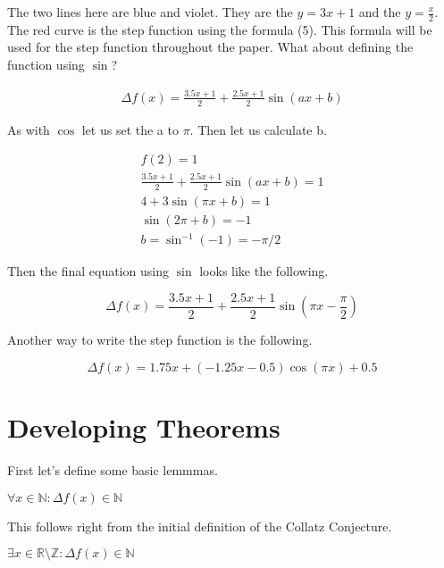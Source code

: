 \documentclass{article}
\begin{document}
\vspace{12pt}

The two lines here are blue and violet. They are the \(y=3x+1\) and the \(y = \frac{x}{2}\).
The red curve is the step function using the formula (5).
This formula will be used for the step function throughout the paper.
What about defining the function using \(\sin\)?

\begin{gather}
  \Delta f(x) = \frac{3.5x+1}{2} + \frac{2.5x+1}{2} \sin(ax + b) \nonumber
\end{gather}

As with \(\cos\) let us set the a to \(\pi\). Then let us calculate b.

\begin{gather}
  f(2) = 1 \nonumber \\
  \frac{3.5x+1}{2} + \frac{2.5x+1}{2} \sin(ax + b) = 1 \nonumber \\
  4 + 3 \sin(\pi x + b) = 1 \nonumber \\
  \sin(2 \pi + b) = -1 \nonumber \\
  b = \sin^{-1}(-1) = -\pi / 2 \nonumber
\end{gather}

Then the final equation using \(\sin\) looks like the following.

\begin{equation}
  \Delta f(x) = \frac{3.5x+1}{2} + \frac{2.5x+1}{2} \sin(\pi x - \frac{\pi}{2})
\end{equation}

Another way to write the step function is the following.

\begin{equation}
  \Delta f(x) = 1.75x + (-1.25x - 0.5)\cos(\pi x) + 0.5
\end{equation}

\section{Developing Theorems}

First let's define some basic lemmmas.

\begin{lemma}
  \(\forall x \in \mathbb{N}: \Delta f(x) \in \mathbb{N}\)
\end{lemma}

This follows right from the initial definition of the Collatz Conjecture.

\begin{lemma}
  \(\exists x \in \mathbb{R} \setminus \mathbb{Z}: \Delta f(x) \in \mathbb{N}\)
\end{lemma}
\end{document}
